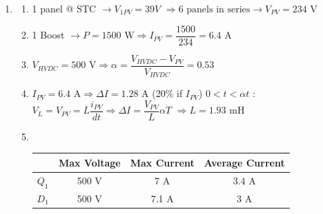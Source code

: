 \begin{enumerate}
\begin{itemize}
            \item Through each BOOST : $\dfrac{3000}{2}=1500 \text {W}$
            \item In the battery : $3000 - \underbrace{1500 - 300}_{\text{max power consumed}} = 1200 \text{ W}$
        \end{itemize}

        \item \begin{enumerate}
            \item 1 panel @ STC $\rightarrow V_{1PV} = 39 V$
            $\Rightarrow \text{6 panels in series} \rightarrow V_{PV} = 234 \text{ V}$

            \item 1 Boost $\rightarrow P = 1500 \text{ W} \Rightarrow I_{PV} = \dfrac{1500}{234} = 6.4 \text{ A}$
            \item $V_{HVDC} = 500 \text{ V} \Rightarrow \alpha = \dfrac{V_{HVDC} - V_{PV}}{V_{HVDC}} = 0.53$
            \item $I_{PV} = 6.4 \text{ A} \Rightarrow \Delta I = 1.28 \text{ A}$ (20\% if $I_{PV}$)
            \newline \underline{$0 < t < \alpha t$} : $V_L = V_{PV} = L \dfrac{i_{PV}}{dt} \Rightarrow \Delta I = \dfrac{V_{PV}}{L}\alpha T$
            \newline $\Rightarrow L = 1.93 \text{ mH}$
            \item \ 
            
            \begin{tabular}{|c|c|c|c|}
                \hline
                & Max Voltage & Max Current & Average Current \\
                \hline
                $Q_1$ & 500 V & 7 A & 3.4 A \\
                \hline
                $D_1$ & 500 V & 7.1 A & 3 A \\
                \hline
            \end{tabular}
        \end{enumerate}


\end{enumerate}
